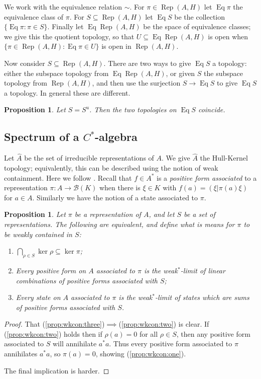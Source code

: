 \documentclass[a4paper,11pt]{article}
\newcommand{\mc}[1]{{\mathcal{#1}}}
\newcommand{\Rep}{\operatorname{Rep}}
\newcommand{\Eq}{\operatorname{Eq}}
\newtheorem{proposition}[lemma]{Proposition}
\begin{document}
We work with the equivalence relation $\sim$.  For $\pi\in\Rep(A,H)$ let
$\Eq\pi$ the equivalence class of $\pi$.  For $S\subseteq\Rep(A,H)$ let
$\Eq S$ be the collection $\{\Eq\pi : \pi \in S\}$.  Finally let $\Eq\Rep(A,H)$
be the space of equivalence classes; we give this the quotient topology, so
that $U\subseteq \Eq\Rep(A,H)$ is open when $\{\pi\in\Rep(A,H):\Eq\pi\in U\}$
is open in $\Rep(A,H)$.

Now consider $S\subseteq \Rep(A,H)$.  There are two ways to give $\Eq S$ a
topology: either the subspace topology from $\Eq\Rep(A,H)$, or given $S$ the
subspace topology from $\Rep(A,H)$, and then use the surjection $S\rightarrow
\Eq S$ to give $\Eq S$ a topology.  In general these are different.

\begin{proposition}
Let $S=S^u$.  Then the two topologies on $\Eq S$ coincide.
\end{proposition}


\subsection{Spectrum of a $C^*$-algebra}

Let $\hat A$ be the set of irreducible representations of $A$.  We give
$\hat A$ the Hull-Kernel topology; equivalently, this can be described using
the notion of weak containment.  Here we follow \cite[Chapter~3.4]{dix}.
Recall that $f\in A^*$ is a \emph{positive form associated} to a representation
$\pi:A\rightarrow\mc B(K)$ when there is $\xi\in K$ with
$f(a) = (\xi|\pi(a)\xi)$ for $a\in A$.  Similarly we have the notion of
a state associated to $\pi$.

\begin{proposition}\label{prop:wkcon}
Let $\pi$ be a representation of $A$, and let $S$ be a set of representations.
The following are equivalent, and define what is means for $\pi$ to be
\emph{weakly contained} in $S$:
\begin{enumerate}
\item\label{prop:wkcon:one}
$\bigcap_{\rho\in S} \ker\rho \subseteq \ker\pi$;
\item\label{prop:wkcon:two}
Every positive form on $A$ associated to $\pi$ is the weak$^*$-limit
of linear combinations of positive forms associated with $S$;
\item\label{prop:wkcon:three}
Every state on $A$ associated to $\pi$ is the weak$^*$-limit
of states which are sums of positive forms associated with $S$.
\end{enumerate}
\end{proposition}
\begin{proof}
That (\ref{prop:wkcon:three})$\implies$(\ref{prop:wkcon:two}) is clear.
If (\ref{prop:wkcon:two}) holds then if $\rho(a)=0$ for all $\rho\in S$,
then any positive form associated to $S$ will annihilate $a^*a$.
Thus every positive form associated to $\pi$ annihilates $a^*a$, so
$\pi(a)=0$, showing (\ref{prop:wkcon:one}).

The final implication is harder.
\end{proof}
\end{document}
